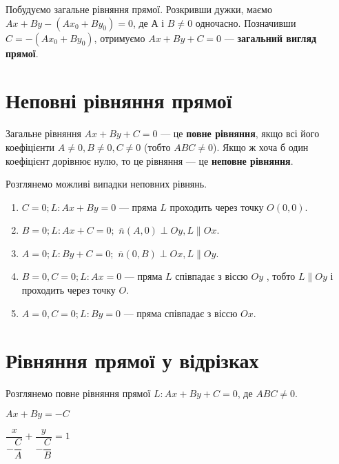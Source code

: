 Побудуємо загальне рівняння прямої. Розкривши дужки, маємо
$Ax + By - (Ax_0 + By_0) = 0$,
де $А$ і $B \neq 0$  одночасно. Позначивши $C = -(Ax_0 + By_0)$, отримуємо
$Ax + By + C = 0$ --- \textbf{загальний вигляд прямої}.  

\section{Неповні рівняння прямої}

\begin{definition}
	Загальне рівняння $Ax + By + C = 0$ --- це \textbf{повне рівняння}, якщо всі його
	коефіцієнти $A \neq 0, B \neq 0, C \neq 0$ (тобто $ABC \neq 0$). Якщо ж хоча б один коефіцієнт
	дорівнює нулю, то це рівняння --- це \textbf{неповне рівняння}.
\end{definition}

Розглянемо можливі випадки неповних рівнянь.
\begin{enumerate}
\item $C = 0; L: Ax + By = 0$ --- пряма $L$ проходить через точку $O(0,0)$.
\item $B = 0; L: Ax + C = 0;$ $\overline{n}(A, 0) \perp Oy, L \parallel Ox$.
\item $A = 0; L: By + C = 0;$ $\overline{n}(0, B) \perp Ox, L \parallel Oy$.
\item $B = 0, C = 0; L: Ax = 0$ --- пряма $L$ співпадає з віссю $Oy$ , тобто $L \parallel Oy$ і проходить через точку $O$.
\item $A = 0, C = 0; L: By = 0$ --- пряма співпадає з віссю $Ox$.
\end{enumerate}

\section{Рівняння прямої у відрізках}

Розглянемо повне рівняння прямої $L: Ax + By + C = 0$, де $ABC \neq 0$.

\parbox{140px}{}
\parbox{140px}{$Ax + By = -C$
	
$\dfrac{x}{-\dfrac{C}{A}} + \dfrac{y}{-\dfrac{C}{B}} = 1$}

